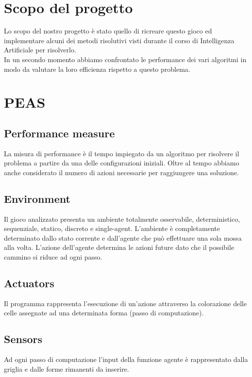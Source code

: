 \section{Scopo del progetto}
Lo scopo del nostro progetto è stato quello di ricreare questo gioco ed implementare alcuni dei metodi risolutivi visti durante il corso di Intelligenza Artificiale per risolverlo. \\
In un secondo momento abbiamo confrontato le performance dei vari algoritmi in modo da valutare la loro efficienza rispetto a questo problema.

\section{PEAS}

\subsection{Performance measure}
La misura di performance è il tempo impiegato da un algoritmo per risolvere il problema a partire da una delle configurazioni iniziali. Oltre al tempo abbiamo anche considerato il numero di azioni necessarie per raggiungere una soluzione.

\subsection{Environment}
Il gioco analizzato presenta un ambiente totalmente osservabile, deterministico, sequenziale, statico, discreto e single-agent.  L'ambiente è completamente determinato dallo stato corrente e dall'agente che può effettuare una sola mossa alla volta.
L'azione dell'agente determina le azioni future dato che il possibile cammino
si riduce ad ogni passo.

\subsection{Actuators}
Il programma rappresenta l'esecuzione di un'azione attraverso la colorazione delle celle assegnate ad una determinata forma (passo di computazione).

\subsection{Sensors}
Ad ogni passo di computazione l'input della funzione agente è rappresentato dalla griglia e dalle forme rimanenti da inserire.


